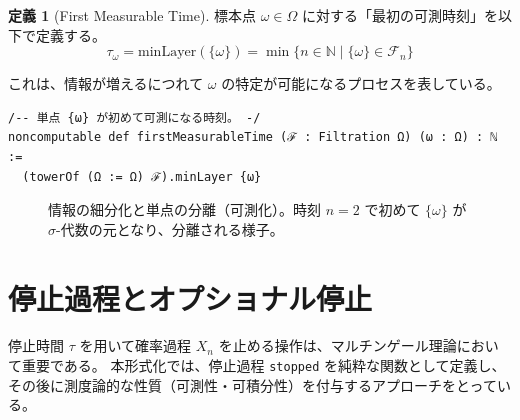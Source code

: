\documentclass[a4paper,11pt]{article}
\theoremstyle{definition}
\newtheorem{definition}{定義}[section]
\theoremstyle{plain}
\begin{document}
\begin{definition}[First Measurable Time]
標本点 $\omega \in \Omega$ に対する「最初の可測時刻」を以下で定義する。
\[ \tau_{\omega} = \mathrm{minLayer}(\{\omega\}) = \min \{ n \in \mathbb{N} \mid \{\omega\} \in \mathcal{F}_n \} \]
\end{definition}

これは、情報が増えるにつれて $\omega$ の特定が可能になるプロセスを表している。

\begin{lstlisting}[caption=単点の最初の可測時刻]
/-- 単点 {ω} が初めて可測になる時刻。 -/
noncomputable def firstMeasurableTime (ℱ : Filtration Ω) (ω : Ω) : ℕ :=
  (towerOf (Ω := Ω) ℱ).minLayer {ω}
\end{lstlisting}

\begin{figure}[htbp]
\centering
{}
\caption{情報の細分化と単点の分離（可測化）。時刻 $n=2$ で初めて $\{\omega\}$ が $\sigma$-代数の元となり、分離される様子。}
\end{figure}

\section{停止過程とオプショナル停止}

停止時間 $\tau$ を用いて確率過程 $X_n$ を止める操作は、マルチンゲール理論において重要である。
本形式化では、停止過程 \texttt{stopped} を純粋な関数として定義し、その後に測度論的な性質（可測性・可積分性）を付与するアプローチをとっている。
\end{document}
